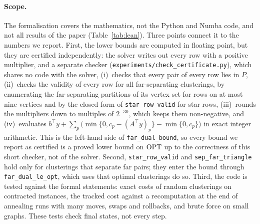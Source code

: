 \paragraph{Scope.}  The formalisation covers the mathematics, not the Python
and Numba code, and not all results of the paper (Table~\ref{tab:lean}).
Three points connect it to the numbers we report.  First, the lower bounds
are computed in floating point, but they are certified independently: the
solver writes out every row with a positive multiplier, and a separate checker
(\texttt{experiments/check\_certificate.py}), which shares no code with the
solver, (i)~checks that every pair of every row lies in $P$, (ii)~checks the
validity of every row for all far-separating clusterings, by enumerating the
far-separating partitions of its vertex set for rows on at most nine vertices
and by the closed form of \texttt{star\_row\_valid} for star rows, (iii)~rounds
the multipliers down to multiples of $2^{-30}$, which keeps them non-negative,
and (iv)~evaluates $b^\top y+\sum_{p}\bigl(\min\{0,c_p-(A^\top y)_p\}-\min\{0,c_p\}\bigr)$
in exact integer arithmetic.  This is the left-hand side of
\texttt{far\_dual\_bound}, so every bound we report as certified is a proved
lower bound on $\mathrm{OPT}$ up to the correctness of this short checker, not of the
solver.  Second, \texttt{star\_row\_valid} and \texttt{sep\_far\_triangle} hold
only for clusterings that separate far pairs; they enter the bound through
\texttt{far\_dual\_le\_opt}, which uses that optimal clusterings do so.  Third,
the code is tested against the formal statements: exact costs of random
clusterings on contracted instances, the tracked cost against a recomputation
at the end of annealing runs with many moves, swaps and rollbacks, and brute
force on small graphs.  These tests check final states, not every step.
